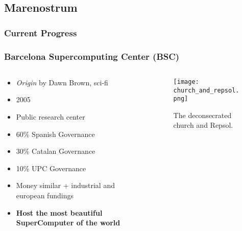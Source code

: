 \subsection{Marenostrum}
\begin{frame}
    \frametitle{Current Progress}

    \tableofcontents[currentsection,
                     subsectionstyle=show/shaded/hide,
                     sectionstyle=show/hide]

\end{frame}


\begin{frame}
\frametitle{Barcelona Supercomputing Center (BSC)}
	\begin{columns}
	\begin{column}{0.4\textwidth}
		\begin{itemize}
			\item \textit{Origin} by Dawn Brown, sci-fi
			\item 2005
			\item Public research center
			\item 60\% Spanish Governance
			\item 30\% Catalan Governance
			\item 10\% UPC Governance
			\item Money similar + industrial and european fundings
			\item \textbf{Host the most beautiful SuperComputer of the world}
		\end{itemize}
	\end{column}
	\begin{column}{0.6\textwidth}
		\begin{figure}[H]
			\centering
			\texttt{[image: church\_and\_repsol.png]}
			\caption{The deconsecrated church and Repsol.}
		\end{figure}
	\end{column}
	\end{columns}
\end{frame}


